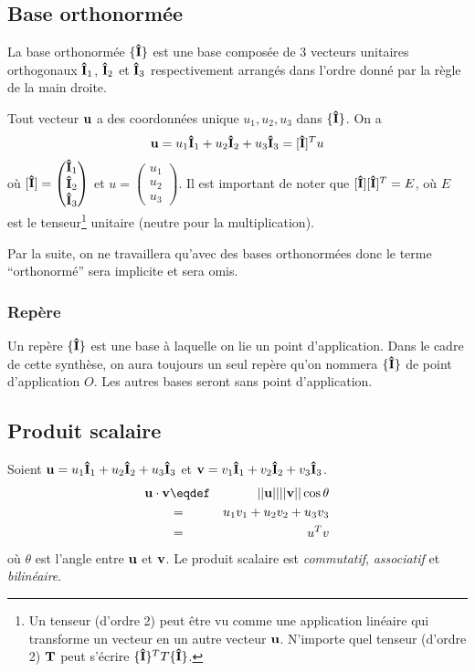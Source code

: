 \subsection{Base orthonormée}
La base orthonormée $\{{\bf\hat{I}}\}$ est une base composée de 3 vecteurs unitaires orthogonaux ${\bf\hat{I}}_1$, ${\bf\hat{I}}_2$ et ${\bf\hat{I}}_3$ respectivement arrangés dans l'ordre donné par la règle de la main droite.

Tout vecteur ${\bf u}$ a des coordonnées unique $u_1, u_2, u_3$ dans $\{{\bf\hat{I}}\}$.
On a
\[ {\bf u} = u_1{\bf\hat{I}}_1 + u_2{\bf\hat{I}}_2 + u_3{\bf\hat{I}}_3 = [{\bf\hat{I}}]^T u \]
où $[{\bf\hat{I}}] =
\begin{pmatrix}
  {\bf\hat{I}}_1\\{\bf\hat{I}}_2\\{\bf\hat{I}}_3
\end{pmatrix}$ et $u =
\begin{pmatrix}
  u_1 \\ u_2 \\ u_3
\end{pmatrix}$.
Il est important de noter que $[{\bf\hat{I}}][{\bf\hat{I}}]^T = E$, où $E$ est le tenseur\footnote{Un tenseur
(d'ordre 2) peut être vu comme une application linéaire qui transforme un vecteur  en
un autre vecteur ${\bf u}$. N'importe quel tenseur (d'ordre 2) $\bf{T}$ peut s'écrire $ \{{\bf\hat{I}}\}^TT\{{\bf\hat{I}}\}$.} 
unitaire (neutre pour la multiplication).

Par la suite, on ne travaillera qu'avec des bases orthonormées donc le terme ``orthonormé'' sera implicite et sera omis.

\subsubsection{Repère}
Un repère $\{{\bf\hat{I}}\}$ est une base à laquelle on lie un point d'application.
Dans le cadre de cette synthèse, on aura toujours un seul repère qu'on nommera $\{{\bf\hat{I}}\}$ de point d'application $O$.
Les autres bases seront sans point d'application.

\subsection{Produit scalaire}
Soient ${\bf u} = u_1{\bf\hat{I}}_1 + u_2{\bf\hat{I}}_2 + u_3{\bf\hat{I}}_3$ et ${\bf v} = v_1{\bf\hat{I}}_1 + v_2{\bf\hat{I}}_2 + v_3{\bf\hat{I}}_3$.
\begin{eqnarray*}
  \fv{u}\cdot\fv{v} & \eqdef & ||\fv{u}|| ||\fv{v}|| \cos\theta\\
                    & = & u_1v_1 + u_2v_2 + u_3v_3\\
                    & = & u^T v
\end{eqnarray*}
où $\theta$ est l'angle entre ${\bf u}$ et ${\bf v}$.
Le produit scalaire est {\em commutatif}, {\em associatif} et {\em bilinéaire}.

